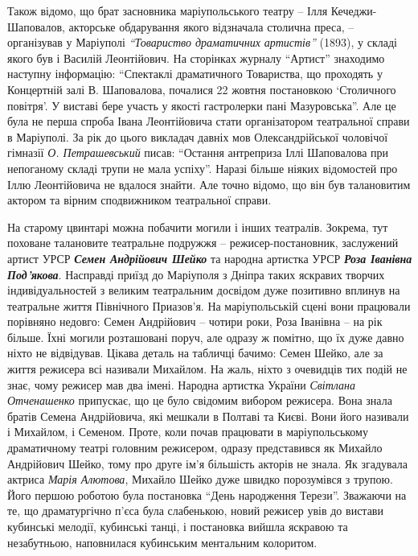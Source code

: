 Також відомо, що брат засновника маріупольського театру – Ілля
Кечеджи-Шаповалов, акторське обдарування якого відзначала столична преса, –
організував у Маріуполі \emph{\enquote{Товариство драматичних артистів}} (1893), у складі
якого був і Василій Леонтійович. На сторінках журналу \enquote{Артист} знаходимо
наступну інформацію: \enquote{Спектаклі драматичного Товариства, що проходять у
Концертній залі В. Шаповалова, почалися 22 жовтня постановкою \enquote{Столичного
повітря}. У виставі бере участь у якості гастролерки пані Мазуровська}. Але це
була не перша спроба Івана Леонтійовича стати організатором театральної справи
в Маріуполі. За рік до цього викладач давніх мов Олександрійської чоловічої
гімназії \emph{О. Петрашевський} писав: \enquote{Остання антреприза Іллі Шаповалова при
непоганому складі трупи не мала успіху}. Наразі більше ніяких відомостей про
Іллю Леонтійовича не вдалося знайти. Але точно відомо, що він був талановитим
актором та вірним сподвижником театральної справи.


На старому цвинтарі можна побачити могили і інших театралів.  Зокрема, тут
поховане талановите театральне подружжя – режисер-постановник, заслужений
артист УРСР \emph{\textbf{Семен Андрійович Шейко}} та народна артистка УРСР \emph{\textbf{Роза Іванівна
Под'якова}}. Насправді приїзд до Маріуполя з Дніпра таких яскравих творчих
індивідуальностей з великим театральним досвідом дуже позитивно вплинув на
театральне життя Північного Приазов'я. На маріупольській сцені вони працювали
порівняно недовго: Семен Андрійович – чотири роки, Роза Іванівна – на рік
більше. Їхні могили розташовані поруч, але одразу ж помітно, що їх дуже давно
ніхто не відвідував. Цікава деталь на табличці бачимо: Семен Шейко, але за
життя режисера всі називали Михайлом. На жаль, ніхто з очевидців тих подій не
знає, чому режисер мав два імені. Народна артистка України \emph{Світлана Отченашенко}
припускає, що це було свідомим вибором режисера. Вона знала братів Семена
Андрійовича, які мешкали в Полтаві та Києві. Вони його називали і Михайлом, і
Семеном. Проте, коли почав працювати в маріупольському драматичному театрі
головним режисером, одразу представився як Михайло Андрійович Шейко, тому про
друге ім'я більшість акторів не знала. Як згадувала актриса \emph{Марія Алютова},
Михайло Шейко  дуже швидко порозумівся з трупою. Його першою роботою була
постановка \enquote{День народження Терези}. Зважаючи на те, що драматургічно п'єса
була слабенькою, новий режисер увів до вистави кубинські мелодії, кубинські
танці, і постановка вийшла яскравою та незабутньою, наповнилася кубинським
ментальним колоритом.

